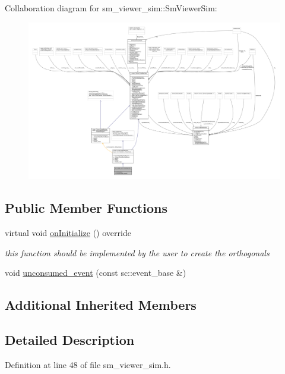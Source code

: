 Collaboration diagram for sm\+\_\+viewer\+\_\+sim\+:\+:Sm\+Viewer\+Sim\+:
\nopagebreak
\begin{figure}[H]
\begin{center}
\leavevmode
\includegraphics[width=350pt]{structsm__viewer__sim_1_1SmViewerSim__coll__graph}
\end{center}
\end{figure}
\subsection*{Public Member Functions}
\begin{DoxyCompactItemize}
\item 
virtual void \hyperlink{structsm__viewer__sim_1_1SmViewerSim_a1ad4e963a078af53a55097c6eb78cae0}{on\+Initialize} () override
\begin{DoxyCompactList}\small\item\em this function should be implemented by the user to create the orthogonals \end{DoxyCompactList}\item 
void \hyperlink{structsm__viewer__sim_1_1SmViewerSim_a7b9ef19f73db25f93b1b540eb744365b}{unconsumed\+\_\+event} (const sc\+::event\+\_\+base \&)
\end{DoxyCompactItemize}
\subsection*{Additional Inherited Members}


\subsection{Detailed Description}


Definition at line 48 of file sm\+\_\+viewer\+\_\+sim.\+h.




